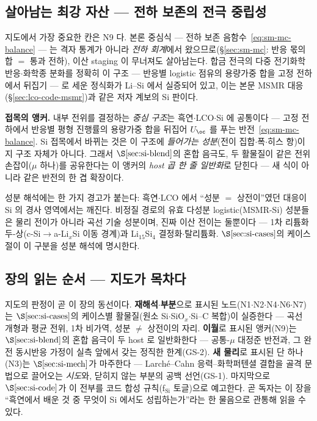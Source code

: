 \subsection{살아남는 최강 자산 --- 전하 보존의 전극 중립성}\label{ssec:si-carry}
지도에서 가장 중요한 칸은 N9 다. 본론 중심식 --- 전하 보존 음함수~\eqref{eq:sm-mc-balance} --- 는 격자
통계가 아니라 \emph{전하 회계}에서 왔으므로(\S\ref{sec:sm-mc}: 반응 몫의 합 $=$ 통과 전하), 이산 staging
이 무너져도 살아남는다. 합금 전극의 다중 전기화학 반응$\cdot$화학종 분화를 정확히 이 구조 --- 반응별
logistic 점유의 용량가중 합을 고정 전하에서 뒤집기 --- 로 세운 정식화가 Li--Si 에서 실증되어
있고\cite{verbrugge_lisi2016}, 이는 본문 MSMR 대응(\S\ref{sec:lco-code-msmr})과 같은 저자 계보의 Si 판이다.

\begin{keybox}
\textbf{접목의 앵커.} 내부 전위를 결정하는 \emph{중심 구조}는 흑연$\cdot$LCO$\cdot$Si 에 공통이다 ---
고정 전하에서 반응별 평형 진행률의 용량가중 합을 뒤집어 $U_\oc$ 를 푸는
반전~\eqref{eq:sm-mc-balance}. Si 접목에서 바뀌는 것은 이 구조에 \emph{들어가는 성분}(전이
집합$\cdot$폭$\cdot$히스 항)이지 구조 자체가 아니다. 그래서 $\S\ref{sec:si-blend}$의 혼합 음극도, 두
활물질이 같은 전위 손잡이($\mu$ 하나)를 공유한다는 이 앵커의 \emph{host 곱 한 줄 일반화}로 닫힌다 ---
새 식이 아니라 같은 반전의 한 겹 확장이다.
\end{keybox}

성분 해석에는 한 가지 경고가 붙는다: 흑연$\cdot$LCO 에서 ``성분 $=$ 상전이''였던 대응이 Si 의 경사
영역에서는 깨진다. 비정질 경로의 유효 다성분 logistic(MSMR-Si) 성분들은 물리 전이가 아니라 곡선 기술
성분이며, 진짜 이산 전이는 둘뿐이다 --- 1차 리튬화 두-상(c-Si$\to$a-Li$_x$Si 이동 경계)과
Li$_{15}$Si$_4$ 결정화$\cdot$탈리튬화. $\S\ref{sec:si-cases}$의 케이스 절이 이 구분을 성분 해석에 명시한다.

\subsection{장의 읽는 순서 --- 지도가 목차다}\label{ssec:si-guide}
지도의 판정이 곧 이 장의 동선이다. \textbf{재해석$\cdot$부분}으로 표시된 노드(N1$\cdot$N2$\cdot$N4$\cdot$N6$\cdot$N7)는
$\S\ref{sec:si-cases}$의 케이스별 활물질(원소 Si$\cdot$SiO$_x$$\cdot$Si--C 복합)이 실증한다 --- 곡선 개형과
평균 전위, 1차 비가역, 성분 $\ne$ 상전이의 자리. \textbf{이월}로 표시된 앵커(N9)는 $\S\ref{sec:si-blend}$의
혼합 음극이 두 host 로 일반화한다 --- 공통-$\mu$ 대정준 반전과, 그 완전 동시반응 가정이 실측 앞에서 갖는
정직한 한계(GS-2). \textbf{새 물리}로 표시된 단 하나(N3)는 $\S\ref{sec:si-mech}$가 마주한다 ---
Larch\'e--Cahn 응력--화학퍼텐셜 결합을 골격 문법으로 끌어오는 \emph{시도}와, 닫히지 않는 부분의 공백
선언(GS-1). 마지막으로 $\S\ref{sec:si-code}$가 이 전부를 코드 합성 규칙(f$_\mathrm{Si}$ 토글)으로
예고한다. 곧 독자는 이 장을 ``흑연에서 배운 것 중 무엇이 Si 에서도 성립하는가''라는 한 물음으로 관통해
읽을 수 있다.

